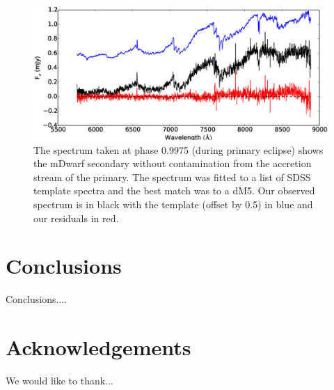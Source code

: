 \documentclass[a4paper,fleqn,usenatbib]{mnras}
\begin{document}
\begin{figure}
\centering
\includegraphics[width=\textwidth]{images/modelfit.eps}
\caption[Caption for spectrum]{The spectrum taken at phase 0.9975 (during primary eclipse) shows the mDwarf secondary without contamination from the accretion stream of the primary. The spectrum was fitted to a list of SDSS template spectra and the best match was to a dM5. Our observed spectrum is in black with the template (offset by 0.5) in blue and our residuals in red. }
\label{fig:sloanfit}
\end{figure}



\section{Conclusions}

Conclusions....

\section*{Acknowledgements}
We would like to thank...







\end{document}
